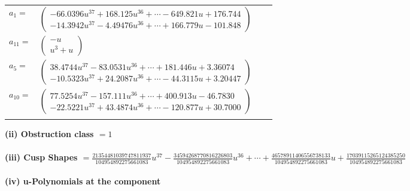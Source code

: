 \documentclass[1p]{elsarticle_modified}
\theoremstyle{definition}
\begin{document}
\begin{tabular}{m{7pt} m{180pt} m{7pt} m{180pt} }
\flushright $a_{1}=$&$\begin{pmatrix}-66.0396 u^{37}+168.125 u^{36}+\cdots-649.821 u+176.744\\-14.3942 u^{37}-4.49476 u^{36}+\cdots+166.779 u-101.848\end{pmatrix}$ \\
\flushright $a_{11}=$&$\begin{pmatrix}- u\\u^3+u\end{pmatrix}$ \\
\flushright $a_{5}=$&$\begin{pmatrix}38.4744 u^{37}-83.0531 u^{36}+\cdots+181.446 u+3.36074\\-10.5323 u^{37}+24.2087 u^{36}+\cdots-44.3115 u+3.20447\end{pmatrix}$ \\
\flushright $a_{10}=$&$\begin{pmatrix}77.5254 u^{37}-157.111 u^{36}+\cdots+400.913 u-46.7830\\-22.5221 u^{37}+43.4874 u^{36}+\cdots-120.877 u+30.7000\end{pmatrix}$\\&\end{tabular}
\flushleft \textbf{(ii) Obstruction class $= 1$}\\~\\
\flushleft \textbf{(iii) Cusp Shapes $= \frac{21354481039747811937}{104954892275661083} u^{37}-\frac{34594268770816226803}{104954892275661083} u^{36}+\cdots+\frac{46578911406556738133}{104954892275661083} u+\frac{17039115265124385250}{104954892275661083}$}\\~\\
\newpage\renewcommand{\arraystretch}{1}
\flushleft \textbf{(iv) u-Polynomials at the component}\newline \\
\end{document}
